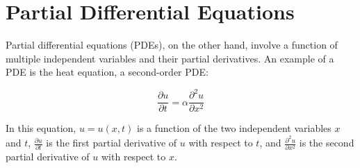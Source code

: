 \section{Partial Differential Equations}

Partial differential equations (PDEs), on the other hand, involve a
function of multiple independent variables and their partial
derivatives. An example of a PDE is the heat equation, a second-order
PDE: 

\begin{equation}
\frac{\partial u}{\partial t} = \alpha \frac{\partial^2 u}{\partial x^2}
\end{equation}

In this equation, $u = u(x, t)$ is a function of the two independent
variables $x$ and $t$, $\frac{\partial u}{\partial t}$ is the first
partial derivative of $u$ with respect to $t$, and $\frac{\partial^2
  u}{\partial x^2}$ is the second partial derivative of $u$ with
respect to $x$.



